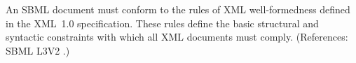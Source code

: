 An SBML document must conform to the rules of XML well-formedness defined
in the XML~1.0 specification.  These rules define the basic structural and
syntactic constraints with which all XML documents must comply.
(References: SBML L3V2 .)
